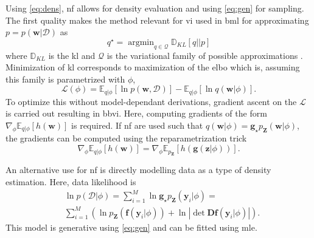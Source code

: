 \documentclass[12pt,fleqn,twocolumn]{article}
\newcommand{\ginv}{\mathbf f}
\newcommand{\push}{\mathbf g_\star p_\mathbf Z}
\begin{document}
Using \eqref{eq:dens}, \acrshort{nf} allows for density evaluation and using \eqref{eq:gen} for sampling.
The first quality makes the method relevant for \acrfull{vi} used in \acrshort{bml} for approximating $p=p(\mathbf w | \mathcal D)$ as 
\begin{equation}
    q^\star = \operatorname{argmin}_{q\in \mathcal Q} \mathbb D_{KL}[q || p] 
\end{equation}
where $\mathbb D_{KL}$ is the \acrfull{kl} and $\mathcal Q$ is the variational family of possible approximations \cite{Blei2016VariationalIA}.
Minimization of \acrshort{kl} corresponds to maximization of the \acrfull{elbo} which is, assuming this family is parametrized with $\phi$,
\begin{equation}
    \mathcal L(\phi) = \mathbb E_{q|\phi}[\ln p(\mathbf w, \mathcal D)] - \mathbb E_{q|\phi}[\ln q(\mathbf w|\phi)].
\end{equation}
To optimize this without model-dependant derivations, gradient ascent on the $\mathcal L$ is carried out resulting in \acrfull{bbvi}.
Here, computing gradients of the form $ \nabla_\phi \mathbb E_{q|\phi}[h(\mathbf w)]$ is required.
If \acrshort{nf} are used such that $q(\mathbf w|\phi)=\push(\mathbf w| \phi)$, the gradients can be computed using the reparametrization trick \cite{JimenezRezende2015VariationalIW}
\begin{equation}
    \nabla_\phi \mathbb E_{q|\phi}[h(\mathbf w)]
    =
    \nabla_\phi \mathbb E_{p_\mathbf Z}[h(\mathbf g(\mathbf z | \phi))].
\end{equation}

An alternative use for \acrshort{nf} is directly modelling data as a type of density estimation.
Here, data likelihood is
\begin{align*}
    & \ln p (\mathcal D| \phi)  = \sum_{i=1}^M \ln \push(\mathbf y_i|\phi) = \\
    & \sum_{i=1}^M \left(
        \ln p_\mathbf Z(\ginv(\mathbf y_i|\phi)) + \ln \left| \det \mathbf D\ginv(\mathbf y_i|\phi)\right|
    \right).
\end{align*}
This model is generative using \eqref{eq:gen} and can be fitted using \acrfull{mle}.
\end{document}
